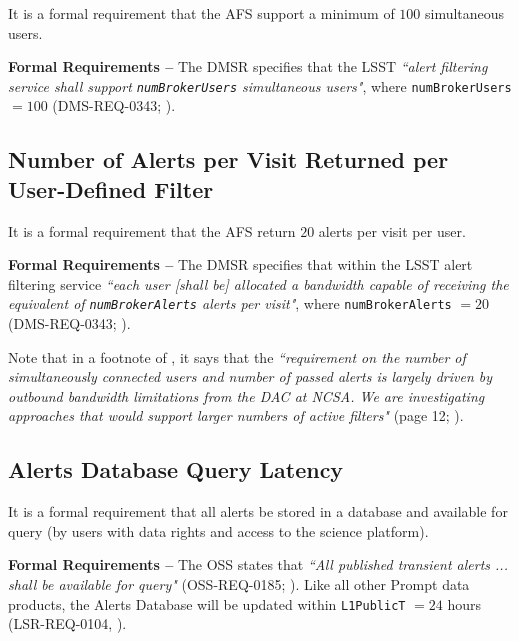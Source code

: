 \documentclass[DM,authoryear,toc]{lsstdoc}
\begin{document}
It is a formal requirement that the AFS support a minimum of $100$ simultaneous users.

{\bf Formal Requirements --} The DMSR specifies that the LSST {\it ``alert filtering service shall support {\tt numBrokerUsers} simultaneous users"}, where {\tt numBrokerUsers} $=100$ (DMS-REQ-0343; ).


\subsection{Number of Alerts per Visit Returned per User-Defined Filter}\label{ssec:AFS_returns}

It is a formal requirement that the AFS return $20$ alerts per visit per user.

{\bf Formal Requirements --} The DMSR specifies that within the LSST alert filtering service {\it ``each user [shall be] allocated a bandwidth capable of receiving the equivalent of {\tt numBrokerAlerts} alerts per visit"}, where {\tt numBrokerAlerts} $=20$ (DMS-REQ-0343; ).

Note that in a footnote of , it says that the {\it ``requirement on the number of simultaneously connected users and number of passed alerts is largely driven by outbound bandwidth limitations from the DAC at NCSA. We are investigating approaches that would support larger numbers of active filters"} (page 12; ).

\subsection{Alerts Database Query Latency}

It is a formal requirement that all alerts be stored in a database and available for query (by users with data rights and access to the science platform).

{\bf Formal Requirements --} The OSS states that {\it ``All published transient alerts ... shall be available for query"} (OSS-REQ-0185; ). Like all other Prompt data products, the Alerts Database will be updated within {\tt L1PublicT} $=24$ hours (LSR-REQ-0104, ).


\clearpage


\end{document}
